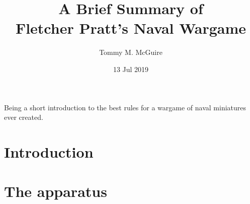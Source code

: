 \documentclass[twocolumn]{article}
\begin{document}
\title{{\small A Brief Summary of} \\ Fletcher Pratt's Naval Wargame}
\author{Tommy M. McGuire}
\date{13 Jul 2019}

\maketitle

Being a short introduction to the best rules for a wargame of naval miniatures ever created.


\section*{Introduction}

\section{The apparatus}
\end{document}
